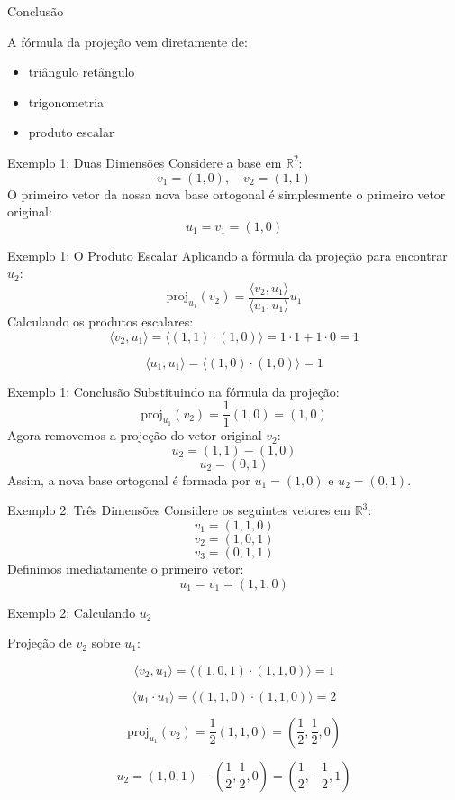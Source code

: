 \documentclass{beamer}
\begin{document}
\begin{frame}{Conclusão}

A fórmula da projeção vem diretamente de:
\begin{itemize}
    \item triângulo retângulo
    \item trigonometria
    \item produto escalar
\end{itemize}

\end{frame}
\begin{frame}{Exemplo 1: Duas Dimensões}
Considere a base em $\mathbb{R}^2$:
\[
v_1=(1,0), \quad v_2=(1,1)
\]
O primeiro vetor da nossa nova base ortogonal é simplesmente o primeiro vetor original:
\[
u_1 = v_1 = (1,0)
\]
\end{frame}
\begin{frame}{Exemplo 1: O Produto Escalar}
Aplicando a fórmula da projeção para encontrar $u_2$:
\[
\text{proj}_{u_1}(v_2)
=
\frac{\langle v_2, u_1 \rangle}
{\langle u_1, u_1 \rangle}
u_1
\]
Calculando os produtos escalares:
\[
\langle v_2, u_1 \rangle
=
\langle (1,1) \cdot (1,0) \rangle
=
1\cdot1 + 1\cdot0
=
1
\]

\[
\langle u_1 , u_1 \rangle
=
\langle (1,0) \cdot (1,0) \rangle
=
1
\]
\end{frame}

\begin{frame}{Exemplo 1: Conclusão}
Substituindo na fórmula da projeção:
\[
\text{proj}_{u_1}(v_2) = \frac{1}{1}(1,0) = (1,0)
\]
Agora removemos a projeção do vetor original $v_2$:
\[
u_2 = (1,1) - (1,0)
\]
\[
u_2 = (0,1)
\]
Assim, a nova base ortogonal é formada por $u_1=(1,0)$ e $u_2=(0,1)$.
\end{frame}

\begin{frame}{Exemplo 2: Três Dimensões}
Considere os seguintes vetores em $\mathbb{R}^3$:
\[
v_1=(1,1,0)
\]
\[
v_2=(1,0,1)
\]
\[
v_3=(0,1,1)
\]
Definimos imediatamente o primeiro vetor:
\[
u_1=v_1=(1,1,0)
\]
\end{frame}
\begin{frame}{Exemplo 2: Calculando $u_2$}

Projeção de $v_2$ sobre $u_1$:

\[
\langle v_2, u_1 \rangle
=
\langle (1,0,1) \cdot (1,1,0) \rangle
=
1
\]

\[
\langle u_1 \cdot u_1 \rangle
=
\langle (1,1,0) \cdot (1,1,0) \rangle
=
2
\]

\[
\text{proj}_{u_1}(v_2)
=
\frac12(1,1,0)
=
\left(\frac12,\frac12,0\right)
\]

\[
u_2
=
(1,0,1)
-
\left(\frac12,\frac12,0\right)
=
\left(\frac12,-\frac12,1\right)
\]

\end{frame}
\end{document}
